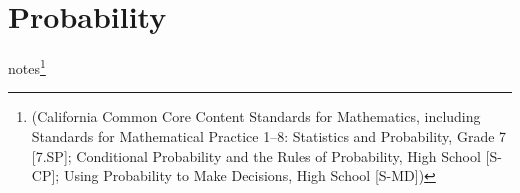 \section[Probability]{Probability} 

\begin{abstract}
    Probability is the branch of mathematics that studies the possible outcomes of given events together with the outcomes' relative likelihoods and distributions. In common usage, the word "probability" is used to mean the chance that a particular event (or set of events) will occur expressed on a linear scale from 0 (impossibility) to 1 (certainty), also expressed as a percentage between 0 and 100\%. The analysis of events governed by probability is called statistics.
\end{abstract}



















notes\footnote[5]{(California Common Core Content Standards for Mathematics, including Standards for Mathematical Practice 1–8: Statistics and Probability, Grade 7 [7.SP]; Conditional Probability and the Rules of Probability, High School [S-CP]; Using Probability to Make Decisions, High School [S-MD])}